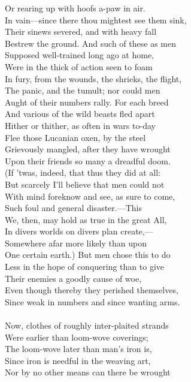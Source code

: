 Or rearing up with hoofs a-paw in air.\\
In vain—since there thou mightest see them sink,\\
Their sinews severed, and with heavy fall\\
Bestrew the ground. And such of these as men\\
Supposed well-trained long ago at home,\\
Were in the thick of action seen to foam\\
In fury, from the wounds, the shrieks, the flight,\\
The panic, and the tumult; nor could men\\
Aught of their numbers rally. For each breed\\
And various of the wild beasts fled apart\\
Hither or thither, as often in wars to-day\\
Flee those Lucanian oxen, by the steel\\
Grievously mangled, after they have wrought\\
Upon their friends so many a dreadful doom.\\
(If 'twas, indeed, that thus they did at all:\\
But scarcely I'll believe that men could not\\
With mind foreknow and see, as sure to come,\\
Such foul and general disaster.—This\\
We, then, may hold as true in the great All,\\
In divers worlds on divers plan create,—\\
Somewhere afar more likely than upon\\
One certain earth.) But men chose this to do\\
Less in the hope of conquering than to give\\
Their enemies a goodly cause of woe,\\
Even though thereby they perished themselves,\\
Since weak in numbers and since wanting arms.\\
\\
Now, clothes of roughly inter-plaited strands\\
Were earlier than loom-wove coverings;\\
The loom-wove later than man's iron is,\\
Since iron is needful in the weaving art,\\
Nor by no other means can there be wrought\\
